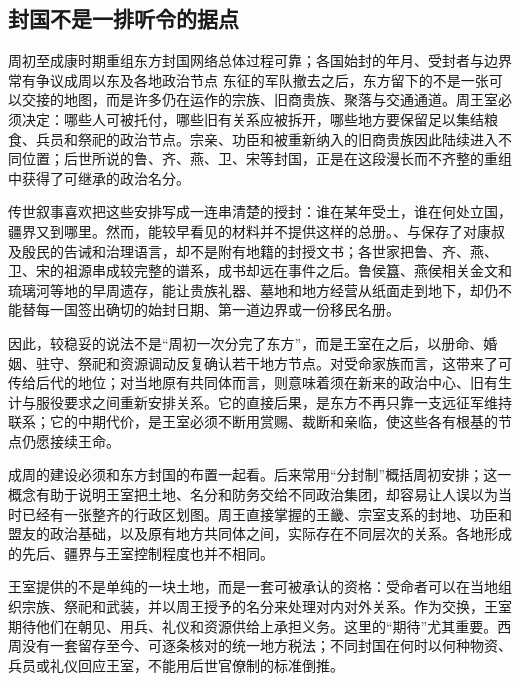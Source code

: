 \subsection{封国不是一排听令的据点}

\begin{event}{周初至成康时期}{重组东方封国网络}{总体过程可靠；各国始封的年月、受封者与边界常有争议}{成周以东及各地政治节点}
东征的军队撤去之后，东方留下的不是一张可以交接的地图，而是许多仍在运作的宗族、旧商贵族、聚落与交通通道。周王室必须决定：哪些人可被托付，哪些旧有关系应被拆开，哪些地方要保留足以集结粮食、兵员和祭祀的政治节点。宗亲、功臣和被重新纳入的旧商贵族因此陆续进入不同位置；后世所说的鲁、齐、燕、卫、宋等封国，正是在这段漫长而不齐整的重组中获得了可继承的政治名分。

传世叙事喜欢把这些安排写成一连串清楚的授封：谁在某年受土，谁在何处立国，疆界又到哪里。然而，能较早看见的材料并不提供这样的总册。、与保存了对康叔及殷民的告诫和治理语言，却不是附有地籍的封授文书；各世家把鲁、齐、燕、卫、宋的祖源串成较完整的谱系，成书却远在事件之后。鲁侯簋、燕侯相关金文和琉璃河等地的早周遗存，能让贵族礼器、墓地和地方经营从纸面走到地下，却仍不能替每一国签出确切的始封日期、第一道边界或一份移民名册。

因此，较稳妥的说法不是“周初一次分完了东方”，而是王室在之后，以册命、婚姻、驻守、祭祀和资源调动反复确认若干地方节点。对受命家族而言，这带来了可传给后代的地位；对当地原有共同体而言，则意味着须在新来的政治中心、旧有生计与服役要求之间重新安排关系。它的直接后果，是东方不再只靠一支远征军维持联系；它的中期代价，是王室必须不断用赏赐、裁断和亲临，使这些各有根基的节点仍愿接续王命。
\end{event}

成周的建设必须和东方封国的布置一起看。后来常用“分封制”概括周初安排；这一概念有助于说明王室把土地、名分和防务交给不同政治集团，却容易让人误以为当时已经有一张整齐的行政区划图。周王直接掌握的王畿、宗室支系的封地、功臣和盟友的政治基础，以及原有地方共同体之间，实际存在不同层次的关系。各地形成的先后、疆界与王室控制程度也并不相同。

王室提供的不是单纯的一块土地，而是一套可被承认的资格：受命者可以在当地组织宗族、祭祀和武装，并以周王授予的名分来处理对内对外关系。作为交换，王室期待他们在朝见、用兵、礼仪和资源供给上承担义务。这里的“期待”尤其重要。西周没有一套留存至今、可逐条核对的统一地方税法；不同封国在何时以何种物资、兵员或礼仪回应王室，不能用后世官僚制的标准倒推。

